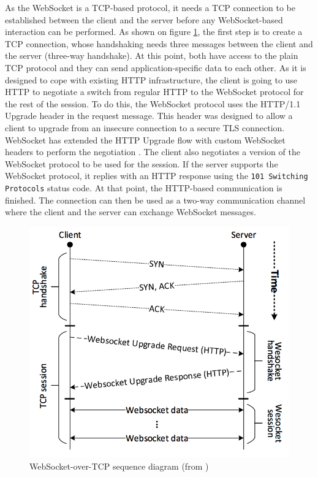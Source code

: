 \documentclass[10pt,journal,compsoc]{IEEEtran}
\newcommand{\ttt}[1]{\texttt{#1}}
\newcommand{\ws}{WebSocket}
\begin{document}
As the \ws{} is a TCP-based protocol, it needs a TCP connection to be established between the client and the server before any \ws-based interaction can be performed.
As shown on figure \ref{fig:websocket_connection}, the first step is to create a TCP connection, whose handshaking needs three messages between the client and the server (three-way handshake).
At this point, both have access to the plain TCP protocol and they can send application-specific data to each other.
As it is designed to cope with existing HTTP infrastructure, the client is going to use HTTP to negotiate a switch from regular HTTP to the \ws{} protocol for the rest of the session. %
To do this, the \ws{} protocol uses the \mbox{HTTP/1.1} Upgrade header in the request message. %
This header was designed to allow a client to upgrade from an insecure connection to a secure TLS connection. %
\ws{} has extended the HTTP Upgrade flow with custom \ws{} headers to perform the negotiation \cite{HighPerfBrowserNetworking:websocket}.
The client also negotiates a version of the \ws{} protocol to be used for the session. %
If the server supports the \ws{} protocol, it replies with an HTTP response using the \ttt{101 Switching Protocols} status code. %
At that point, the HTTP-based communication is finished. %
The connection can then be used as a two-way communication channel where the client and the server can exchange \ws{} messages.

\begin{figure}
    \centering
    \includegraphics[width=\linewidth]{websocket_tcp_diagram.png}
    \caption{\ws-over-TCP sequence diagram (from \cite{performanceEvaluationOfWebsocketProtocol})}
    \label{fig:websocket_connection}
\end{figure}
\end{document}
